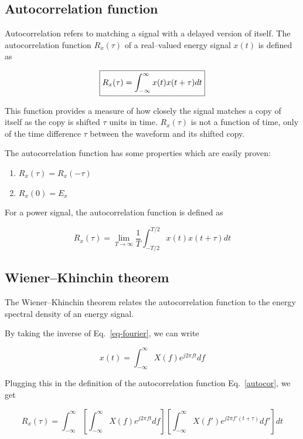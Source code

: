 \subsection{Autocorrelation function}

Autocorrelation refers to matching a signal with a delayed version of itself. The autocorrelation function $R_x(\tau)$ of a real--valued energy signal $x(t)$ is defined as

\begin{equation}
\fbox{$\displaystyle
R_x(\tau) = \int_{-\infty}^{\infty}x(t)x(t+\tau)dt \label{autocor}
$}
\end{equation} 

This function provides a measure of how closely the signal matches a copy of itself as the copy is shifted $\tau$ units in time. $R_x(\tau)$ is not a function of time, only of the time difference $\tau$ between the waveform and its shifted copy.

The autocorrelation function has some properties which are easily proven:

\begin{enumerate}
\item
$R_x(\tau) = R_x(-\tau)$
\item
$R_x(0) = E_x$
\end{enumerate}

For a power signal, the autocorrelation function is defined as

\begin{equation}
R_x(\tau) = \lim_{T \to \infty} \frac{1}{T} \int_{-T/2}^{T/2} x(t)x(t+\tau)dt
\end{equation} 

\subsection{Wiener--Khinchin theorem}

The Wiener--Khinchin theorem relates the autocorrelation function to the energy spectral density of an energy signal.

By taking the inverse of Eq.~\ref{eq-fourier}, we can write

\begin{equation}
x(t) = \int_{-\infty}^{\infty} X(f) e^{j 2 \pi f t} df
\end{equation}

Plugging this in the definition of the autocorrelation function Eq.~\ref{autocor}, we get 

\begin{equation}
R_x(\tau) = \int_{-\infty}^{\infty} \left[ \int_{-\infty}^{\infty} X(f) e^{j 2 \pi f t} df \right] \left[ \int_{-\infty}^{\infty} X(f') e^{j 2 \pi f' (t+\tau)} df' \right]dt
\end{equation} 

